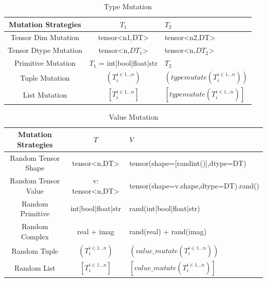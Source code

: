 \documentclass[sigconf]{acmart}
\begin{document}
  \begin{table}[h]
    \centering
    \caption{Type Mutation}
    \label{tab:freq}
    \begin{tabular}{ccl}
      \toprule
      Mutation Strategies&$T_1$&$T_2$\\
      \midrule
      Tensor Dim Mutation & tensor<n1,DT>& tensor<n2,DT>\\
      Tensor Dtype Mutation & tensor<n,$DT_1$>& tensor<n,$DT_2$>\\
      Primitive Mutation & $T_1$ = int|bool|float|str & $T_2$\\
      Tuple Mutation & $(T_i ^ {i\in 1...n})$&$(typemutate(T_i ^ {i\in 1...n}))$ \\
      List Mutation & $[T_i ^ {i\in 1...n}]$&$[typemutate(T_i ^ {i\in 1...n})]$ \\
    \bottomrule
  \end{tabular}
  \end{table}

  \begin{table}[h]
    \centering
    \caption{Value Mutation}
    \label{tab:freq}
    \begin{tabular}{ccl}
      \toprule
      Mutation Strategies&$T$&$V$\\
      \midrule
      Random Tensor Shape& tensor<n,DT>& tensor(shape=[randint()],dtype=DT)\\
      Random Tensor Value& v: tensor<n,DT>& tensor(shape=v.shape,dtype=DT).rand()\\
      Random Primitive& int|bool|float|str & rand(int|bool|float|str)\\
      Random Complex& real + imag & rand(real) + rand(imag)\\
      Random Tuple& $(T_i ^ {i\in 1...n})$&$(value\_mutate(T_i ^ {i\in 1...n}))$ \\
      Random List& $[T_i ^ {i\in 1...n}]$&$[value\_mutate(T_i ^ {i\in 1...n})]$ \\
    \bottomrule
  \end{tabular}
  \end{table}
\end{document}
